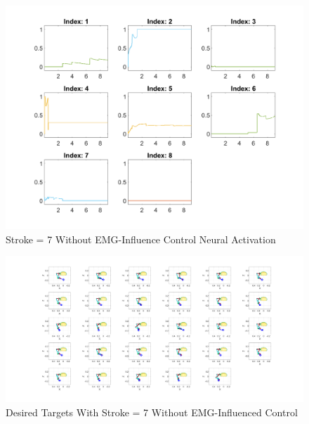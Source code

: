 \begin{figure}[h!]
\centering
\includegraphics[width=1\textwidth]{Pictures/Results/Controller/StrokeWithouControl_NA.png} 
\caption{Stroke = 7 Without EMG-Influence Control Neural Activation} %
\label{fig:WOEMGNA} %
\end{figure}


\newpage
\begin{landscape} %
  \begin{figure}[h!]
    \centering
    \includegraphics[width=1.9\textwidth]{Pictures/Results/Controller/WithStroke29positions.png} %
    \caption{Desired Targets With Stroke = 7 Without EMG-Influenced Control} %
  \end{figure}
\end{landscape} %


